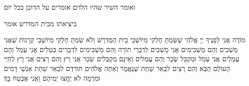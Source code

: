     {\centering
    {\scriptsize    ואומר השיר שהיו הלוים אומרים על הדוכן בכל יום}
    
      \larger ביציאתו מבית המדרש אומר

    }

\begin{tp}{74}
    מוֹדֶה אֲנִי לְפָנֶיךָ יְיָ אֱלֹהַי שֶׁשַּׂמְתָּ חֶלְקִי מִיּוֹשְׁבֵי בֵית הַמֶּדְרָשׁ וְלֹא שַׂמְתָּ חֶלְקִי מִיּוֹשְׁבֵי קְרָנוֹת
    שֶׁאֲנִי מַשְׁכִּים וְהֵם מַשְׁכִּימִים אֲנִי מַשְׁכִּים לְדִבְרֵי תוֹרָה וְהֵם מַשְׁכִּימִים לִדְבָרֵים בְּטֵלִים 
    אֲנִי עָמֵל וְהֵם עֲמֵלִים אֲנִי עָמֵל וּמְקַבֵּל שָׂכָר וְהֵם עֲמֵלִים וְאֵינָם מְקַבְּלִים שָׂכָר
    אֲנִי רָץ וְהֵם רָצִים אֲנִי רָץ לְחַיֵּי הָעוֹלָם הַבָּא וְהֵם רָצִים לִבְאֵר שַׁחַת\hdot
    שֶׁנֶּאֱמֶר וְאַתָּה אֱלֹהִים תּוֹרִדֵם לִבְאֵר שַׁחַת אַנְשֵׁי דָמִים וּמִרְמָה לֹא יֶחֱצוּ יְמֵיהֶם וַאֲנִי אֶבְטַח בָּךְ׃
\end{tp}

